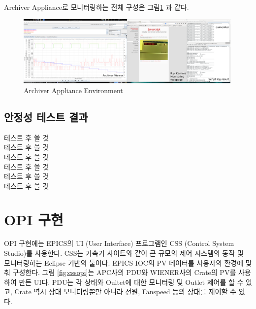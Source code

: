 \documentclass[11pt
  , a4paper
  , article
  , oneside
]{memoir}
\begin{document}
Archiver Appliance로 모니터링하는 전체 구성은 그림\ref{fig:allscreen} 과 같다. 

\begin{figure}[h!]
  \centering
  \includegraphics[width=0.99\textwidth]{./images/allscreen_2_comment.eps}
  \caption{Archiver Appliance Environment}
  \label{fig:allscreen}   
\end{figure}

\clearpage

\subsection{안정성 테스트 결과}

테스트 후 쓸 것\\
테스트 후 쓸 것\\
테스트 후 쓸 것\\
테스트 후 쓸 것\\
테스트 후 쓸 것\\
테스트 후 쓸 것\\


\section{OPI 구현}
OPI 구현에는 EPICS의 UI (User Interface) 프로그램인 CSS (Control System Studio)를 사용한다. CSS는 가속기 사이트와 같이 큰 규모의 제어 시스템의 동작 및 모니터링하는 Eclipse 기반의 툴이다\citep{css}. EPICS IOC의 PV 데이터를 사용자의 환경에 맞춰 구성한다. 그림 \ref{fig:cssopi}는 APC사의 PDU와 WIENER사의 Crate의 PV를 사용하여 만든 UI다. PDU는 각 상태와 Oultet에 대한 모니터링 및 Outlet 제어를 할 수 있고, Crate 역시 상태 모니터링뿐만 아니라 전원, Fanspeed 등의 상태를 제어할 수 있다. 
\end{document}
